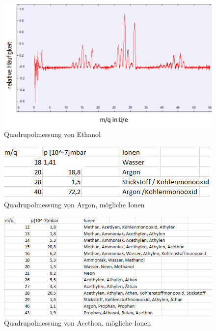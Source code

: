 \documentclass[10pt,a4paper]{article}
\begin{document}
\begin{figure}[h]
	\includegraphics[scale = 0.3]{ethanol1.png}
	\centering
	\caption{Quadrupolmessung von Ethanol}
	\label{arg}
\end{figure}

\begin{figure}[h]
	\includegraphics[scale = 0.5]{argontab.png}
	\centering
	\caption{Quadrupolmessung von Argon, mögliche Ionen}
	\label{argtab}
\end{figure}

\begin{figure}[h]
	\includegraphics[scale = 0.5]{acethontab.png}
	\centering
	\caption{Quadrupolmessung von Acethon, mögliche Ionen}
	\label{acetab}
\end{figure}
\end{document}
